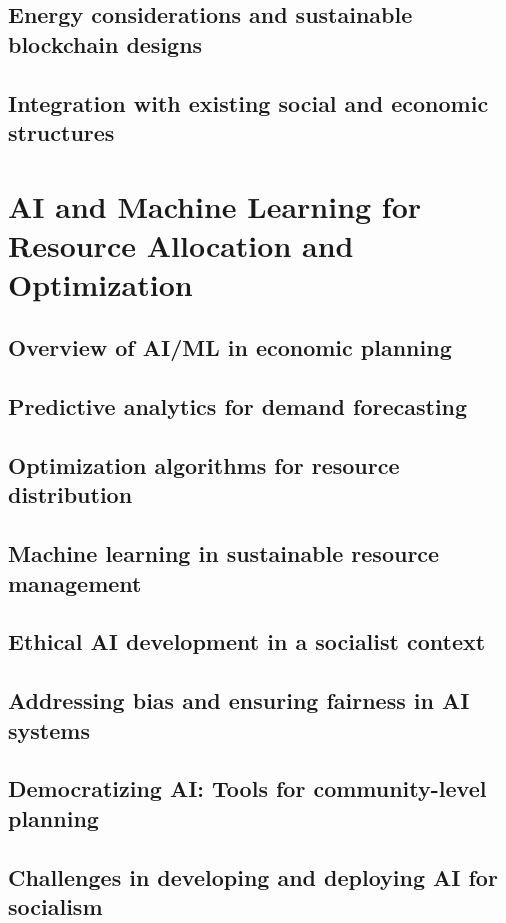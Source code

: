 \subsection{Energy considerations and sustainable blockchain designs}
\subsection{Integration with existing social and economic structures}

\newpage

\section{AI and Machine Learning for Resource Allocation and Optimization}
\subsection{Overview of AI/ML in economic planning}
\subsection{Predictive analytics for demand forecasting}
\subsection{Optimization algorithms for resource distribution}
\subsection{Machine learning in sustainable resource management}
\subsection{Ethical AI development in a socialist context}
\subsection{Addressing bias and ensuring fairness in AI systems}
\subsection{Democratizing AI: Tools for community-level planning}
\subsection{Challenges in developing and deploying AI for socialism}

